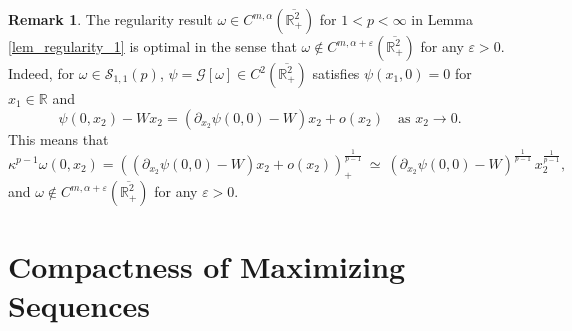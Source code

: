 \documentclass[11pt]{amsart}
\theoremstyle{definition}
\theoremstyle{definition}
\newtheorem{remark}[theorem]{Remark}
\numberwithin{equation}{section}
\newcommand{\0}{\emptyset}
\newcommand{\bbR}{\mathbb R}
\newcommand{\calS}{\mathcal S}
\begin{document}
			
			\begin{remark}
				\label{rmk_optimal_regularity}
				The regularity result ${\omega} \in C^{m, \alpha}(\overline{\bbR^2_{+}})$ for $1<p< \infty$ in Lemma \ref{lem_regularity_1} is optimal in the sense that ${\omega} \notin C^{m, \alpha+\varepsilon}(\overline{\bbR^2_{+}})$ for any $\varepsilon > 0$.
				Indeed, for $\omega \in \calS_{1,1}(p)$, $\psi=\mathcal{G}[\omega] \in C^2(\overline{\mathbb{R}^2_+})$ satisfies $\psi(x_1, 0) = 0$ for $x_1 \in \mathbb{R}$ and  
				\[
				\psi(0, x_2)-Wx_2 = (\partial_{x_2}\psi(0,0)-W)x_2 + o(x_2) \quad \textrm{as}\,\, x_2\to0.
				\]
				This means that 
				\[
				\kappa^{p-1} \omega(0, x_2) = \left( (\partial_{x_2}\psi(0,0) - W)x_2+ o(x_2)\right)^{\frac{1}{p - 1}}_+ 
				\ \simeq \ (\partial_{x_2}\psi(0,0) - W)^{\frac{1}{p - 1}} \, x_2^{\frac{1}{p - 1}},
				\]
				and ${\omega}\notin C^{m, \alpha+ \varepsilon}(\overline{\bbR^2_{+}})$ for any $\varepsilon > 0$. 
			\end{remark}
			
			
			\section{Compactness of Maximizing Sequences}\label{sec:existence}
			
\end{document}
